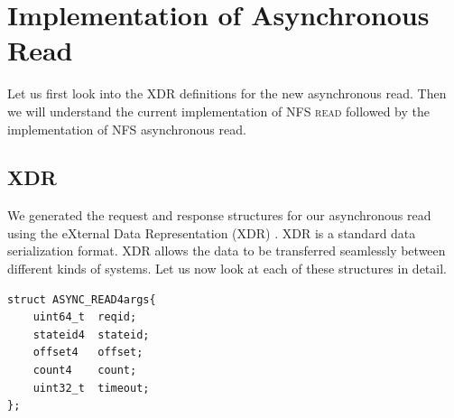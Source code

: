 \section{Implementation of Asynchronous Read}
Let us first look into the XDR definitions for the new asynchronous read. Then we will understand the current implementation of \textsc{NFS read} followed by the implementation of NFS asynchronous read.
\subsection{XDR}
We generated the request and response structures for our asynchronous read using the eXternal Data Representation (XDR) \cite{XDR}. XDR is a standard data serialization format. XDR allows the data to be transferred seamlessly between different kinds of systems. Let us now look at each of these structures in detail.

\begin{lstlisting}
struct ASYNC_READ4args{
	uint64_t  reqid; 
	stateid4  stateid; 
	offset4	  offset; 
	count4	  count;
	uint32_t  timeout; 
};
\end{lstlisting}

